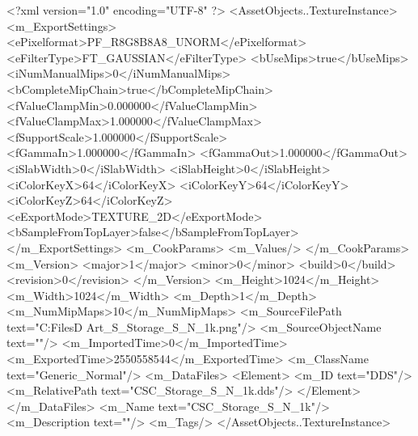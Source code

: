 <?xml version="1.0" encoding="UTF-8" ?>
<AssetObjects..TextureInstance>
	<m_ExportSettings>
		<ePixelformat>PF_R8G8B8A8_UNORM</ePixelformat>
		<eFilterType>FT_GAUSSIAN</eFilterType>
		<bUseMips>true</bUseMips>
		<iNumManualMips>0</iNumManualMips>
		<bCompleteMipChain>true</bCompleteMipChain>
		<fValueClampMin>0.000000</fValueClampMin>
		<fValueClampMax>1.000000</fValueClampMax>
		<fSupportScale>1.000000</fSupportScale>
		<fGammaIn>1.000000</fGammaIn>
		<fGammaOut>1.000000</fGammaOut>
		<iSlabWidth>0</iSlabWidth>
		<iSlabHeight>0</iSlabHeight>
		<iColorKeyX>64</iColorKeyX>
		<iColorKeyY>64</iColorKeyY>
		<iColorKeyZ>64</iColorKeyZ>
		<eExportMode>TEXTURE_2D</eExportMode>
		<bSampleFromTopLayer>false</bSampleFromTopLayer>
	</m_ExportSettings>
	<m_CookParams>
		<m_Values/>
	</m_CookParams>
	<m_Version>
		<major>1</major>
		<minor>0</minor>
		<build>0</build>
		<revision>0</revision>
	</m_Version>
	<m_Height>1024</m_Height>
	<m_Width>1024</m_Width>
	<m_Depth>1</m_Depth>
	<m_NumMipMaps>10</m_NumMipMaps>
	<m_SourceFilePath text="C:\Users\Shadow\Desktop\Working Files\3D Art\Storage_S\CSC_Storage_S_N_1k.png"/>
	<m_SourceObjectName text=""/>
	<m_ImportedTime>0</m_ImportedTime>
	<m_ExportedTime>2550558544</m_ExportedTime>
	<m_ClassName text="Generic_Normal"/>
	<m_DataFiles>
		<Element>
			<m_ID text="DDS"/>
			<m_RelativePath text="CSC_Storage_S_N_1k.dds"/>
		</Element>
	</m_DataFiles>
	<m_Name text="CSC_Storage_S_N_1k"/>
	<m_Description text=""/>
	<m_Tags/>
</AssetObjects..TextureInstance>

